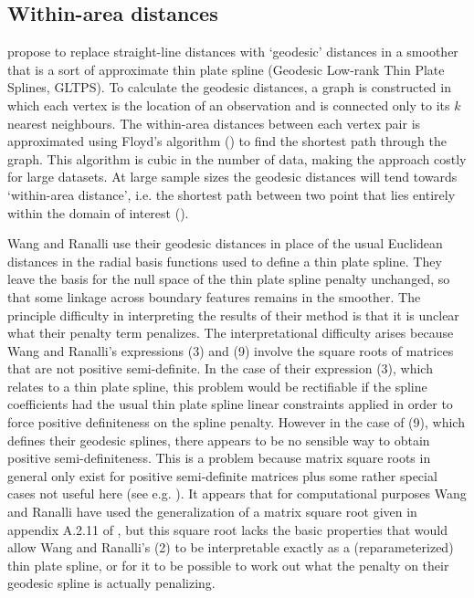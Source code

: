 \documentclass[smallextended]{svjour3}       %
\begin{document}
\subsection*{Within-area distances}

\cite{Wang:2007tf} propose to replace straight-line distances with `geodesic' distances in a smoother that is a sort of approximate thin plate spline (Geodesic Low-rank Thin Plate Splines, GLTPS). To calculate the geodesic distances, a graph is constructed in which each vertex is the location of an observation and is connected only to its $k$ nearest neighbours. The within-area distances between each vertex pair is approximated using  Floyd's algorithm (\cite{Floyd:1962:A9S:367766.368168}) to find the shortest path through the graph. This algorithm is cubic in the number of data, making the approach costly for large datasets. At large sample sizes the geodesic distances will tend towards `within-area distance', i.e. the shortest path between two point that lies entirely within the domain of interest (\cite{Bernstein:2000tp}). 

Wang and Ranalli use their geodesic distances in place of the usual Euclidean distances in the radial basis functions used to define a thin plate spline. They leave the basis for the null space of the thin plate spline penalty unchanged, so that some linkage across boundary features remains in the smoother. The principle difficulty in interpreting the results of their method is that it is unclear what their penalty term penalizes. The interpretational difficulty arises because  Wang and Ranalli's expressions (3) and (9) involve the square roots of matrices that are not positive semi-definite. In the case of their expression (3), which relates to a thin plate spline, this problem would be rectifiable if the spline coefficients had the usual thin plate spline linear constraints applied in order to force positive definiteness on the spline penalty. However in the case of (9), which defines their geodesic splines, there appears to be no sensible way to obtain positive semi-definiteness. This is a problem because matrix square roots in general only exist for positive semi-definite matrices plus some rather special cases not useful here (see e.g. \cite{Higham1987405}). It appears that for computational purposes Wang and Ranalli have used the generalization of a matrix square root given in appendix A.2.11 of \cite{ruppert2003semiparametric}, but this square root lacks the basic properties that would allow Wang and Ranalli's (2) to be interpretable exactly as a (reparameterized) thin plate spline, or for it to be possible to work out what the penalty on their geodesic spline is actually penalizing. 
\end{document}
